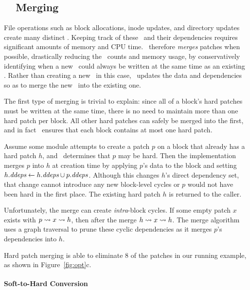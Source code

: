 
\subsection{\Nrb\ \ChDesc\ Merging}
\label{sec:patch:merge}

File operations such as block allocations, inode updates, and directory updates
create many distinct \chdescs. Keeping track of these
\chdescs\ and their dependencies requires significant amounts of memory and
CPU time.
%
\Kudos\ therefore \emph{merges} patches when possible, drastically reducing
the \chdesc\ counts and memory usage, by conservatively identifying when a
new \patch\ could always be written at the same time as an existing \patch.
%
Rather than creating a new \chdesc\ in this case, \Kudos\ updates the data
and dependencies so as to merge the new \patch\ into the existing one.


The first type of merging is trivial to explain:
%
since all of a block's hard patches must be written at the same time, there
is no need to maintain more than one hard patch per block.
%
All other hard patches can safely be merged into the first,
%
and in fact \Kudos\ ensures that each block contains at most one hard
patch.


Assume some module attempts to create a patch $p$ on a block that already
has a hard patch $h$, and \Kudos\ determines that $p$ may be hard.
%
Then the implementation merges $p$ into $h$ at creation time by applying
$p$'s data to the block and setting $\PDDepset{h} \gets \PDDepset{h} \cup
\PDDepset{p}$.
%
Although this changes $h$'s direct dependency set, that change cannot
introduce any new block-level cycles or $p$ would not have been hard in the
first place.
%
The existing hard patch $h$ is returned to the caller.


Unfortunately, the merge can create \emph{intra}-block cycles.
%
If some empty patch $x$ exists with $p \leadsto x \leadsto h$, then after
the merge $h \leadsto x \leadsto h$.
%
The merge algorithm uses a graph traversal to prune these cyclic
dependencies as it merges $p$'s dependencies into $h$.


Hard patch merging is able to eliminate 8 of the patches in our running
example, as shown in Figure~\ref{fig:opt}c.


\paragraph{Soft-to-Hard Conversion}

